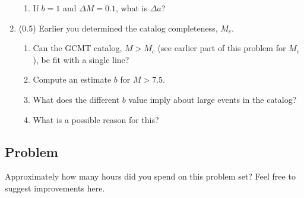 \documentclass[11pt,titlepage,fleqn]{article}
\begin{document}
\begin{enumerate}
\begin{enumerate}
\item If $b = 1$ and $\Delta M = 0.1$, what is $\Delta a$?
\end{enumerate}


\item (0.5) Earlier you determined the catalog completeness, $M_c$.
%
\begin{enumerate}
\item Can the GCMT catalog, $M > M_c$ (see earlier part of this problem for $M_c$), be fit with a single line?
\item Compute an estimate $b$ for $M > 7.5$.
\item What does the different $b$ value imply about large events in the catalog?
\item What is a possible reason for this?
\end{enumerate}

\end{enumerate}


\subsection*{Problem}

Approximately how many hours did you spend on this problem set? Feel free to suggest improvements here.




\end{document}
